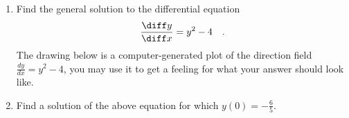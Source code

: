 \begin{enumerate}
\item Find the general solution to the differential equation 
\[
\frac{\diff y}{\diff x}= y^2-4\quad .
\]
The drawing below is a computer-generated plot of the direction field  $\displaystyle \frac{dy}{dx}=y^2-4$, you may use it to get a feeling for what your answer should look like.

\item  Find a solution of the above equation for which $ y(0)= -\frac{6}{5}$. 
\end{enumerate}